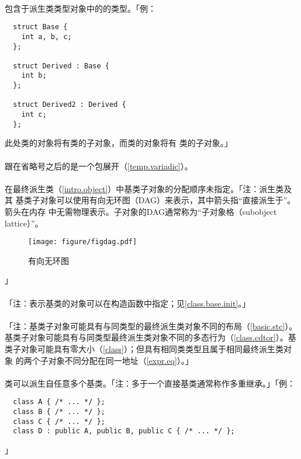 \paragraph{}
包含于派生类类型对象中的的类型。「例：
\begin{lstlisting}
  struct Base {
    int a, b, c;
  };

  struct Derived : Base {
    int b;
  };

  struct Derived2 : Derived {
    int c;
  };
\end{lstlisting}
此处类的对象将有类的子对象，而类的对象将有
类的子对象。」

\paragraph{}
跟在省略号之后的是一个包展开（\ref{temp.variadic}）。

\paragraph{}
在最终派生类（\ref{intro.object}）中基类子对象的分配顺序未指定。「注：派生类及其
基类子对象可以使用有向无环图（DAG）来表示，其中箭头指``直接派生于''。箭头在内存
中无需物理表示。子对象的DAG通常称为``子对象格（subobject lattice）''。
\begin{figure}[htpb]
  \centering
  \texttt{[image: figure/figdag.pdf]}
  \caption{有向无环图}
  \label{fig:dag}
\end{figure}」

\paragraph{}
「注：表示基类的对象可以在构造函数中指定；见\ref{class.base.init}。」

\paragraph{}
「注：基类子对象可能具有与同类型的最终派生类对象不同的布局（\ref{basic.stc}）。
基类子对象可能具有与同类型最终派生类对象不同的多态行为（\ref{class.cdtor}）。基
类子对象可能具有零大小（\ref{class}）；但具有相同类类型且属于相同最终派生类对象
的两个子对象不同分配在同一地址（\ref{expr.eq}）。」

\paragraph{}
类可以派生自任意多个基类。「注：多于一个直接基类通常称作多重继承。」「例：
\begin{lstlisting}
  class A { /* ... */ };
  class B { /* ... */ };
  class C { /* ... */ };
  class D : public A, public B, public C { /* ... */ };
\end{lstlisting}」

